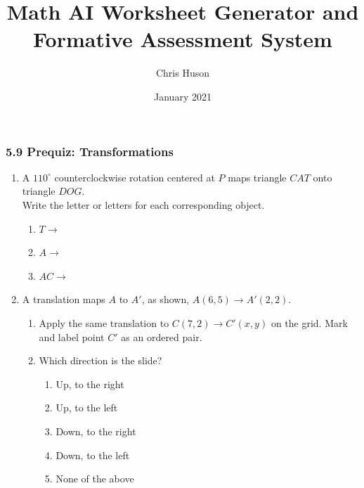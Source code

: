 \documentclass[12pt, twoside]{article}
\title{Math AI Worksheet Generator and Formative Assessment System}
\author{Chris Huson}
\date{January 2021}
\begin{document}
\subsubsection*{5.9 Prequiz: Transformations}
\begin{enumerate}

\item A $110^\circ$ counterclockwise rotation centered at $P$ maps triangle $CAT$ onto triangle $DOG$. \\[0.5cm]
Write the letter or letters for each corresponding object. \vspace{0.5cm}
  \begin{multicols}{2}

    \begin{enumerate}
      \item $T \rightarrow$ \vspace{1.5cm}
      \item $A \rightarrow$ \vspace{1.5cm}
      \item $AC \rightarrow$ \vspace{1.5cm}
    \end{enumerate}
  \end{multicols}

\newpage
\item A translation maps $A$ to $A'$, as shown, $A(6,5) \rightarrow A'(2,2)$.
\begin{multicols}{2}
  \begin{enumerate}
    \item Apply the same translation to $C(7,2)\rightarrow C'(x,y)$ on the grid. Mark and label point $C'$ as an ordered pair.
    \item Which direction is the slide?
    \begin{enumerate}[label=(\Alph*)]
      \item Up, to the right
      \item Up, to the left
      \item Down, to the right
      \item Down, to the left
      \item None of the above
    \end{enumerate} \vspace{2cm}


\end{enumerate}
\end{multicols}
\end{enumerate}
\end{document}
